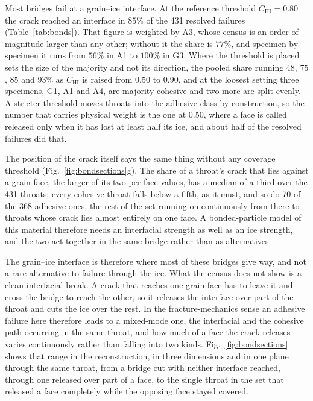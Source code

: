 \documentclass[preprint,12pt,numbers]{elsarticle}
\begin{document}
  Most bridges fail at a grain--ice interface.  At the reference threshold
  $C_\mathrm{HI}=0.80$ the crack reached an interface in $85\%$ of the 431
  resolved failures (Table~\ref{tab:bonds}).  That figure is weighted by A3,
  whose census is an order of magnitude larger than any other; without it the
  share is $77\%$, and specimen by specimen it runs from $56\%$ in A1 to
  $100\%$ in G3.  Where the threshold is placed sets the size of the majority
  and not its direction, the pooled share running $48$, $75$, $85$ and $93\%$
  as $C_\mathrm{HI}$ is raised from $0.50$ to $0.90$, and at the loosest
  setting three specimens, G1, A1 and A4, are majority cohesive and two more
  are split evenly.  A stricter
  threshold moves throats into the adhesive class by construction, so the
  number that carries physical weight is the one at $0.50$, where a face is
  called released only when it has lost at least half its ice, and about half of
  the resolved failures did that.

  The position of the crack itself says the same thing without any coverage
  threshold (Fig.~\ref{fig:bondsections}g).  The share of a throat's crack
  that lies against a grain face, the larger of its two per-face values, has a
  median of a third over the 431 throats; every cohesive throat falls below a
  fifth, as it must, and so do 70 of the 368 adhesive ones, the rest of the
  set running on continuously from there to throats whose crack lies almost
  entirely on one face.
  A bonded-particle model of this material therefore needs an interfacial
  strength as well as an ice strength, and the two act together in the same
  bridge rather than as alternatives.

  The grain--ice interface is therefore where most of these bridges give way,
  and not a rare alternative to failure through the ice.  What the census does
  not show is a clean interfacial break.  A crack that reaches one grain face
  has to leave it and cross the bridge to reach the other, so it releases the
  interface over part of the throat and cuts the ice over the rest.  In the
  fracture-mechanics sense an adhesive failure here therefore leads to a
  mixed-mode one, the interfacial and the cohesive path occurring in the same
  throat, and how much of a face the crack releases varies continuously rather
  than falling into two kinds.  Fig.~\ref{fig:bondsections} shows that range in the
  reconstruction, in three dimensions and in one plane through the same
  throat, from a bridge cut with neither interface reached, through one
  released over part of a face, to the single throat in the set that released
  a face completely while the opposing face stayed covered.
\end{document}
